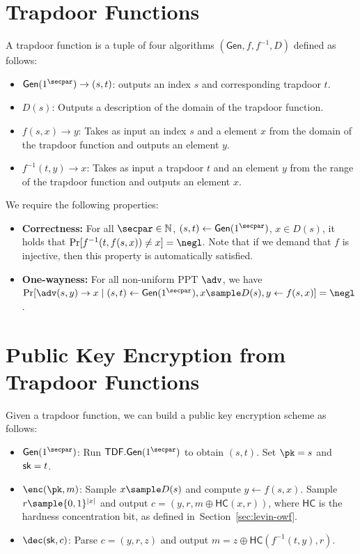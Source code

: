 \documentclass[12pt]{tufte-book}
\newcommand{\gen}{\mathsf{Gen}}
\begin{document}
\section{Trapdoor Functions}
\begin{definition}
    A trapdoor function is a tuple of four algorithms $(\gen, f, f^{-1}, D)$ defined as follows:
    \begin{itemize}
        \item $\gen(1^\secpar) \to (s,t)$: outputs an index $s$ and corresponding trapdoor $t$.
        \item $D(s)$: Outputs a description of the domain of the trapdoor function.
        \item $f(s, x) \to y$: Takes as input an index $s$ and a element $x$ from the domain of the trapdoor function and outputs an element $y$.
        \item $f^{-1}(t, y) \to x$: Takes as input a trapdoor $t$ and an element $y$ from the range of the trapdoor function and outputs an element $x$.
    \end{itemize}
    We require the following properties:
    \begin{itemize}
        \item \textbf{Correctness:} For all $\secpar \in \mathbb{N}$, $(s,t) \gets \gen(1^\secpar)$, $x \in D(s)$, it holds that $\Pr[f^{-1}(t, f(s, x)) \neq x] = \negl$. Note that if we demand that $f$ is injective, then this property is automatically satisfied.
        \item \textbf{One-wayness:} For all non-uniform PPT $\adv$, we have $\Pr[\adv(s, y) \to x \mid (s,t) \gets \gen(1^\secpar), x \sample D(s), y \gets f(s, x)] = \negl$.
    \end{itemize}
\end{definition}

\section{Public Key Encryption from Trapdoor Functions}
Given a trapdoor function, we can build a public key encryption scheme as follows:
\begin{itemize}
    \item $\gen(1^\secpar)$: Run $\mathsf{TDF}.\gen(1^\secpar)$ to obtain $(s,t)$. Set $\pk = s$ and $\mathsf{sk} = t$.
    \item $\enc(\pk, m)$: Sample $x \sample D(s)$ and compute $y \gets f(s, x)$. Sample $r \sample \{0,1\}^{|x|}$ and output $c = (y, r, m \oplus \mathsf{HC}(x,r))$, where $\mathsf{HC}$ is the hardness concentration bit, as defined in~Section~\ref{sec:levin-owf}.
    \item $\dec(\sk, c)$: Parse $c = (y, r, z)$ and output $m = z \oplus \mathsf{HC}(f^{-1}(t, y), r)$.
\end{itemize}
\end{document}
